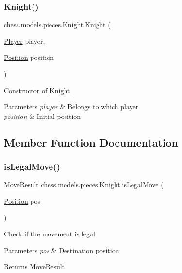 \subsubsection{\texorpdfstring{Knight()}{Knight()}}
{\footnotesize\ttfamily chess.\+models.\+pieces.\+Knight.\+Knight (\begin{DoxyParamCaption}\item[{\mbox{\hyperlink{enumchess_1_1models_1_1enums_1_1_player}{Player}}}]{player,  }\item[{\mbox{\hyperlink{classchess_1_1models_1_1_position}{Position}}}]{position }\end{DoxyParamCaption})}

Constructor of \mbox{\hyperlink{classchess_1_1models_1_1pieces_1_1_knight}{Knight}}


\begin{DoxyParams}{Parameters}
{\em player} & Belongs to which player \\
\hline
{\em position} & Initial position \\
\hline
\end{DoxyParams}


\subsection{Member Function Documentation}
\mbox{\label{classchess_1_1models_1_1pieces_1_1_knight_af1018a686f81f9627d2851c919280448}} 
\subsubsection{\texorpdfstring{is\+Legal\+Move()}{isLegalMove()}}
{\footnotesize\ttfamily \mbox{\hyperlink{enumchess_1_1models_1_1enums_1_1_move_result}{Move\+Result}} chess.\+models.\+pieces.\+Knight.\+is\+Legal\+Move (\begin{DoxyParamCaption}\item[{\mbox{\hyperlink{classchess_1_1models_1_1_position}{Position}}}]{pos }\end{DoxyParamCaption})}

Check if the movement is legal


\begin{DoxyParams}{Parameters}
{\em pos} & Destination position \\
\hline
\end{DoxyParams}
\begin{DoxyReturn}{Returns}
Move\+Result 
\end{DoxyReturn}
\mbox{\label{classchess_1_1models_1_1pieces_1_1_knight_a18c83fa9040a0035d86c3354f3ada4ea}} 
